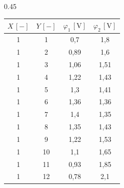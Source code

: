 \begin{subtable}{0.45\textwidth}
                        \centering
                        \begin{tabular}{@{}cccc@{}}
\toprule
$X\,[\mathrm{-}]$ & $Y\,[\mathrm{-}]$ & $\varphi_1\,[\mathrm{V}]$ & $\varphi_2\,[\mathrm{V}]$ \\ \midrule
1                 & 1                 & 0,7                       & 1,8                       \\
1                 & 2                 & 0,89                      & 1,6                       \\
1                 & 3                 & 1,06                      & 1,51                      \\
1                 & 4                 & 1,22                      & 1,43                      \\
1                 & 5                 & 1,3                       & 1,41                      \\
1                 & 6                 & 1,36                      & 1,36                      \\
1                 & 7                 & 1,4                       & 1,35                      \\
1                 & 8                 & 1,35                      & 1,43                      \\
1                 & 9                 & 1,22                      & 1,53                      \\
1                 & 10                & 1,1                       & 1,65                      \\
1                 & 11                & 0,93                      & 1,85                      \\
1                 & 12                & 0,78                      & 2,1                       \\ \bottomrule
\end{tabular}
                        \caption{První podtabulka}
                        \label{tab:prvni}
                    \end{subtable}